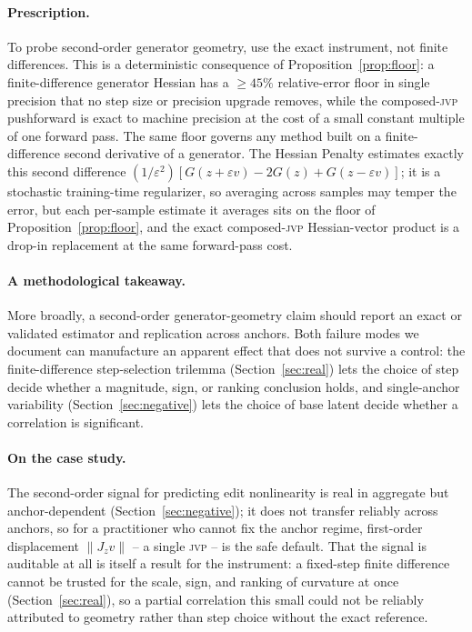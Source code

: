\documentclass[10pt]{article}
\newcommand{\jvp}{\textsc{jvp}}
\newcommand{\eps}{\varepsilon}
\begin{document}
\paragraph{Prescription.} To probe second-order generator geometry, use the exact instrument, not
finite differences. This is a deterministic consequence of Proposition~\ref{prop:floor}: a
finite-difference generator Hessian has a $\geq45\%$ relative-error floor in single precision that no
step size or precision upgrade removes, while the composed-\jvp{} pushforward is exact to machine
precision at the cost of a small constant multiple of one forward pass. The same floor governs any
method built on a finite-difference second derivative of a generator. The Hessian Penalty
\citep{peebles2020} estimates exactly this second difference
$(1/\eps^2)[G(z+\eps v)-2G(z)+G(z-\eps v)]$; it is a stochastic training-time regularizer, so
averaging across samples may temper the error, but each per-sample estimate it averages sits on the
floor of Proposition~\ref{prop:floor}, and the exact composed-\jvp{} Hessian-vector product is a
drop-in replacement at the same forward-pass cost.

\paragraph{A methodological takeaway.} More broadly, a second-order generator-geometry claim
should report an exact or validated estimator and replication across anchors. Both failure modes
we document can manufacture an apparent effect that does not survive a control: the
finite-difference step-selection trilemma (Section~\ref{sec:real}) lets the choice of step decide
whether a magnitude, sign, or ranking conclusion holds, and single-anchor variability
(Section~\ref{sec:negative}) lets the choice of base latent decide whether a correlation is
significant.

\paragraph{On the case study.} The second-order signal for predicting edit nonlinearity is real in
aggregate but anchor-dependent (Section~\ref{sec:negative}); it does not transfer reliably across
anchors, so for a practitioner who cannot fix the anchor regime, first-order displacement
$\lVert J_z v\rVert$ -- a single \jvp{} -- is the safe default. That the signal is auditable at all
is itself a result for the instrument: a fixed-step finite difference cannot be trusted for the scale,
sign, and ranking of curvature at once (Section~\ref{sec:real}), so a partial correlation this small
could not be reliably attributed to geometry rather than step choice without the exact reference.
\end{document}
